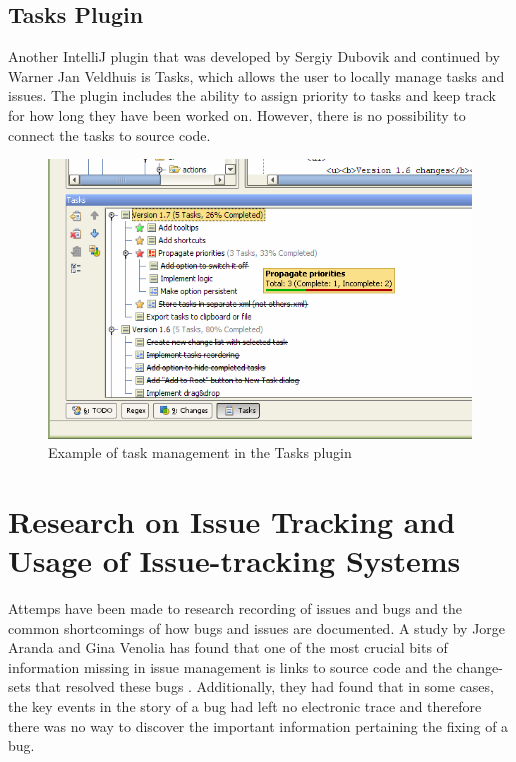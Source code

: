 \documentclass{4thYearProject}
\begin{document}
\subsection{Tasks Plugin}

Another IntelliJ plugin that was developed by Sergiy Dubovik and continued by Warner Jan Veldhuis is Tasks, which allows the user to locally manage tasks and issues. The plugin includes the ability to assign priority to tasks and keep track for how long they have been worked on. However, there is no possibility to connect the tasks to source code. 

\begin{figure}[H]
\includegraphics[scale=0.6]{Tasks}
\centering
\caption{Example of task management in the Tasks plugin}\label{tasks}
\label{fig:tasks}
\end{figure}


\section{Research on Issue Tracking and Usage of Issue-tracking Systems}

Attemps have been made to research recording of issues and bugs and the common shortcomings of how bugs and issues are documented. A study by Jorge Aranda and Gina Venolia has found that one of the most crucial bits of information missing in issue management is links to source code and the change-sets that resolved these bugs \cite{lifeofbugs}. Additionally, they had found that in some cases, the key events in the story of a bug had left no electronic trace and therefore there was no way to discover the important information pertaining the fixing of a bug.
\end{document}
